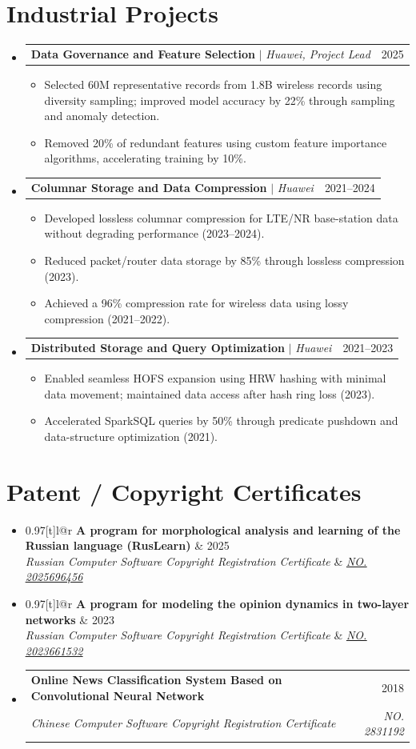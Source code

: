 \documentclass[letterpaper,10pt]{article}
\makeatletter
\newcommand{\link}[2]{\href{#1}{\color{blue}\underline{#2}}}
\newcommand{\resumeItem}[1]{
  \item\small{
    {#1 \vspace{-2pt}}
  }
}
\newcommand{\resumeSubheading}[4]{
  \vspace{-2pt}\item
  \begin{tabular*}{0.97\textwidth}[t]{l@{\extracolsep{\fill}}r}
    \textbf{#1} & #2 \\
    \textit{\small#3} & \textit{\small #4} \\
  \end{tabular*}\vspace{-7pt}
}
\newcommand{\resumeProjectHeading}[2]{
  \item
  \begin{tabular*}{0.97\textwidth}{l@{\extracolsep{\fill}}r}
    \small#1 & #2 \\
  \end{tabular*}\vspace{-7pt}
}
\newenvironment{resumeSubHeadingList}{\begin{itemize}[leftmargin=0.15in, label={}]}{\end{itemize}}
\newenvironment{resumeItemList}{\begin{itemize}}{\end{itemize}}
\makeatother
\begin{document}
\section{Industrial Projects}
\begin{resumeSubHeadingList}
  \resumeProjectHeading{
    \textbf{Data Governance and Feature Selection} $|$ \emph{Huawei, Project Lead}}{2025}
  \begin{resumeItemList}
    \resumeItem{Selected 60M representative records from 1.8B wireless records
                using diversity sampling; improved model accuracy by 22\%
                through sampling and anomaly detection.}
    \resumeItem{Removed 20\% of redundant features using custom feature
                importance algorithms, accelerating training by 10\%.}
  \end{resumeItemList}
  \resumeProjectHeading{
    \textbf{Columnar Storage and Data Compression} $|$ \emph{Huawei}}{2021--2024}
  \begin{resumeItemList}
    \resumeItem{Developed lossless columnar compression for LTE/NR base-station
                data without degrading performance (2023--2024).}
    \resumeItem{Reduced packet/router data storage by 85\% through lossless
                compression (2023).}
    \resumeItem{Achieved a 96\% compression rate for wireless data using lossy
                compression (2021--2022).}
  \end{resumeItemList}
  \resumeProjectHeading{
    \textbf{Distributed Storage and Query Optimization} $|$ \emph{Huawei}}{2021--2023}
  \begin{resumeItemList}
    \resumeItem{Enabled seamless HOFS expansion using HRW hashing with minimal
                data movement; maintained data access after hash ring loss
                (2023).}
    \resumeItem{Accelerated SparkSQL queries by 50\% through predicate pushdown
                and data-structure optimization (2021).}
  \end{resumeItemList}
\end{resumeSubHeadingList}

\section{Patent / Copyright Certificates}
\begin{resumeSubHeadingList}
  \resumeSubheading
    {A program for morphological analysis and learning of the Russian language (RusLearn)}{2025}
    {Russian Computer Software Copyright Registration Certificate}{{\link{https://new.fips.ru/registers-doc-view/fips_servlet?DB=EVM&DocNumber=2025696456&TypeFile=html}{NO. 2025696456}}}
  \resumeSubheading
    {A program for modeling the opinion dynamics in two-layer networks}{2023}
    {Russian Computer Software Copyright Registration Certificate}{{\link{https://new.fips.ru/registers-doc-view/fips_servlet?DB=EVM&DocNumber=2023661532&TypeFile=html}{NO. 2023661532}}}
  \resumeSubheading
    {Online News Classification System Based on Convolutional Neural Network}{2018}
    {Chinese Computer Software Copyright Registration Certificate}{NO. 2831192}
\end{resumeSubHeadingList}
\end{document}
